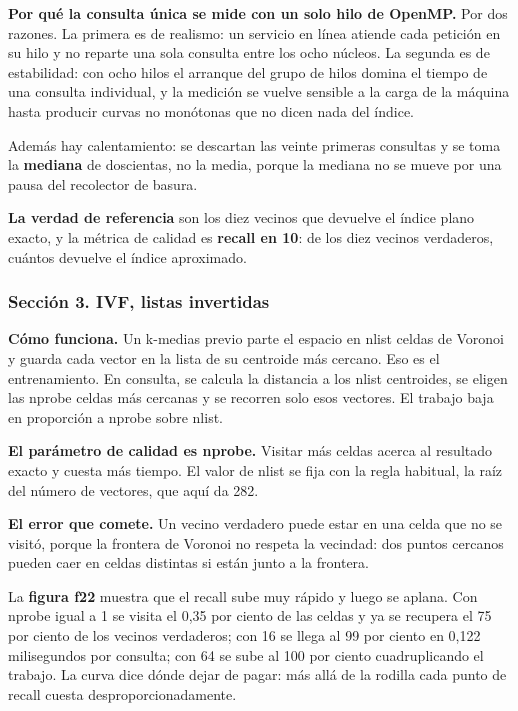 \documentclass[11pt]{article}
\begin{document}
\textbf{Por qué la consulta única se mide con un solo hilo de OpenMP.} Por dos razones. La primera es de realismo: un servicio en línea atiende cada petición en su hilo y no reparte una sola consulta entre los ocho núcleos. La segunda es de estabilidad: con ocho hilos el arranque del grupo de hilos domina el tiempo de una consulta individual, y la medición se vuelve sensible a la carga de la máquina hasta producir curvas no monótonas que no dicen nada del índice.

Además hay calentamiento: se descartan las veinte primeras consultas y se toma la \textbf{mediana} de doscientas, no la media, porque la mediana no se mueve por una pausa del recolector de basura.

\textbf{La verdad de referencia} son los diez vecinos que devuelve el índice plano exacto, y la métrica de calidad es \textbf{recall en 10}: de los diez vecinos verdaderos, cuántos devuelve el índice aproximado.

\subsubsection*{Sección 3. IVF, listas invertidas}
\textbf{Cómo funciona.} Un k-medias previo parte el espacio en nlist celdas de Voronoi y guarda cada vector en la lista de su centroide más cercano. Eso es el entrenamiento. En consulta, se calcula la distancia a los nlist centroides, se eligen las nprobe celdas más cercanas y se recorren solo esos vectores. El trabajo baja en proporción a nprobe sobre nlist.

\textbf{El parámetro de calidad es nprobe.} Visitar más celdas acerca al resultado exacto y cuesta más tiempo. El valor de nlist se fija con la regla habitual, la raíz del número de vectores, que aquí da 282.

\textbf{El error que comete.} Un vecino verdadero puede estar en una celda que no se visitó, porque la frontera de Voronoi no respeta la vecindad: dos puntos cercanos pueden caer en celdas distintas si están junto a la frontera.

La \textbf{figura f22} muestra que el recall sube muy rápido y luego se aplana. Con nprobe igual a 1 se visita el 0,35 por ciento de las celdas y ya se recupera el 75 por ciento de los vecinos verdaderos; con 16 se llega al 99 por ciento en 0,122 milisegundos por consulta; con 64 se sube al 100 por ciento cuadruplicando el trabajo. La curva dice dónde dejar de pagar: más allá de la rodilla cada punto de recall cuesta desproporcionadamente.
\end{document}
